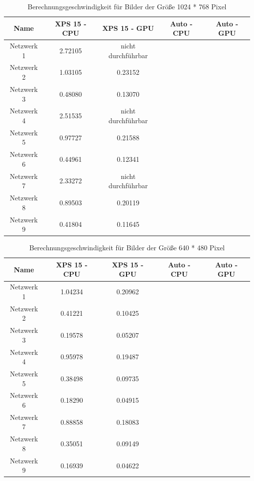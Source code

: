 \begin{table}[H]
    \centering
    \begin{tabular}{ |c|c|c|c|c| }
        \hline
        \textbf{Name} & \textbf{XPS 15 - CPU} & \textbf{XPS 15 - GPU} & \textbf{Auto - CPU} & \textbf{Auto - GPU}   \\ \hline
        Netzwerk 1 & 2.72105 & \textcolor{danger}{nicht durchführbar} & & \\ \hline
        Netzwerk 2 & 1.03105 & 0.23152                                & & \\ \hline
        Netzwerk 3 & 0.48080 & 0.13070                                & & \\ \hline
	
        Netzwerk 4 & 2.51535 & \textcolor{danger}{nicht durchführbar} & & \\ \hline
        Netzwerk 5 & 0.97727 & 0.21588                                & & \\ \hline
        Netzwerk 6 & 0.44961 & 0.12341                                & & \\ \hline

        Netzwerk 7 & 2.33272 & \textcolor{danger}{nicht durchführbar} & & \\ \hline
        Netzwerk 8 & 0.89503 & 0.20119                                & & \\ \hline
        Netzwerk 9 & 0.41804 & 0.11645                                & & \\ \hline
    \end{tabular}
    \caption{Berechnungsgeschwindigkeit für Bilder der Größe 1024 * 768 Pixel}
    \label{tab:1024x768}
\end{table}


\begin{table}[H]
    \centering
    \begin{tabular}{ |c|c|c|c|c| }
        \hline
        \textbf{Name} & \textbf{XPS 15 - CPU} & \textbf{XPS 15 - GPU} & \textbf{Auto - CPU} & \textbf{Auto - GPU}   \\ \hline
        Netzwerk 1 & 1.04234 & 0.20962 & & \\ \hline
        Netzwerk 2 & 0.41221 & 0.10425 & & \\ \hline
        Netzwerk 3 & 0.19578 & 0.05207 & & \\ \hline
	
        Netzwerk 4 & 0.95978 & 0.19487 & & \\ \hline
        Netzwerk 5 & 0.38498 & 0.09735 & & \\ \hline
        Netzwerk 6 & 0.18290 & 0.04915 & & \\ \hline

        Netzwerk 7 & 0.88858 & 0.18083 & & \\ \hline
        Netzwerk 8 & 0.35051 & 0.09149 & & \\ \hline
        Netzwerk 9 & 0.16939 & 0.04622 & & \\ \hline
    \end{tabular}
    \caption{Berechnungsgeschwindigkeit für Bilder der Größe 640 * 480 Pixel}
    \label{tab:640x480}
\end{table}


